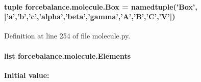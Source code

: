 \hypertarget{namespaceforcebalance_1_1molecule_aa761cf1cf260e15d0b03a6f61569c840}{
\paragraph[{Box}]{\setlength{\rightskip}{0pt plus 5cm}tuple forcebalance.\-molecule.\-Box = namedtuple('Box',\mbox{[}'a','b','c','alpha','beta','gamma','A','B','C','V'\mbox{]})}}\label{namespaceforcebalance_1_1molecule_aa761cf1cf260e15d0b03a6f61569c840}


Definition at line 254 of file molecule.\-py.

\hypertarget{namespaceforcebalance_1_1molecule_a1c99a11e8a749468698c9af6361a8a4c}{
\paragraph[{Elements}]{\setlength{\rightskip}{0pt plus 5cm}list forcebalance.\-molecule.\-Elements}}\label{namespaceforcebalance_1_1molecule_a1c99a11e8a749468698c9af6361a8a4c}
{\bfseries Initial value\-:}
